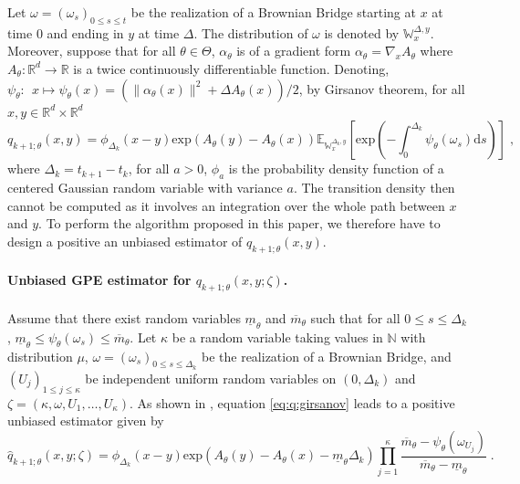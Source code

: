 \documentclass[12pt]{article}
\newcommand{\gpeUB}{\overline{m}_{\parvec}}
\newcommand{\gpeLB}{\underline{m}_{\parvec}}
\def\Xset{\mathbb{R}^d}
\newcommand{\parvec}{\theta}
\newcommand{\parspace}{\Theta}
\newcommand{\hd}[1]{q_{#1}}
\newcommand{\hdhat}[1]{\widehat{q}_{#1}}
\newcommand{\rset}{\ensuremath{\mathbb{R}}}
\newcommand{\rmd}{\ensuremath{\mathrm{d}}}
\newcommand{\eqsp}{\;}
\begin{document}
Let $\omega = (\omega_s)_{0 \leq s \leq t}$ be the realization of a Brownian Bridge starting at $x$ at time 0 and ending in $y$ at time $\Delta$. The distribution of $\omega$ is denoted by  $\mathbb{W}_x^{\Delta,y}$. 
Moreover, suppose that for all $\parvec\in\parspace$, $\alpha_{\parvec}$ is of a gradient form $\alpha_{\parvec} = \nabla_x A_{\parvec}$ where $A_{\parvec}:\Xset \to \rset$ is a twice continuously differentiable function. Denoting, $ \psi_\theta:~~x \mapsto  \psi_\theta(x) = (\|\alpha_{\parvec}(x)\|^2 + \Delta A_{\parvec}(x))/2$, by Girsanov theorem, for all $x, y \in \mathbb{R}^d \times \mathbb{R}^d$
\begin{equation}
\label{eq:q:girsanov}
\hd{k+1;\parvec}(x,y) = \phi_{\Delta_k}(x-y)\mathrm{exp}\left(A_{\parvec}(y) - A_{\parvec}(x)\right)\mathbb{E}_{\mathbb{W}_x^{\Delta_k,y}}\left[\mathrm{exp}\left(-\int_0^{\Delta_k} \psi_{\parvec}(\omega_s)\rmd s\right)\right]\eqsp,
\end{equation}
where $\Delta_k = t_{k+1}-t_k$, for all $a>0$, $\phi_a$ is the probability density function of a centered Gaussian random variable with variance $a$. The transition density then cannot be computed as it involves an integration over the whole path between $x$ and $y$. 
To perform the algorithm proposed in this paper, we therefore have to design a positive an unbiased estimator of $\hd{k+1;\parvec}(x,y)$. 

\paragraph{Unbiased GPE estimator for $\hd{k+1;\parvec}(x,y;\zeta)$.}

Assume that there exist random variables $\gpeLB$ and $\gpeUB$ such that for all $0\leqslant s \leqslant \Delta_k$, $\gpeLB \leqslant \psi_{\parvec}(\omega_s) \leqslant \gpeUB$. Let $\kappa$ be a random variable taking values in $\mathbb{N}$ with distribution $\mu$, $\omega = (\omega_s)_{0 \leq s \leq \Delta_k}$ be the realization of a Brownian Bridge, and $(U_j)_{1\leqslant j \leqslant \kappa}$ be independent uniform random
variables on $(0,\Delta_k)$ and $\zeta = (\kappa,\omega, U_1, \ldots , U_{\kappa})$. As
shown in \cite{fearnhead2008particle}, equation \eqref{eq:q:girsanov} leads to a positive unbiased estimator given by
\[
\hdhat{k+1;\parvec}(x,y;\zeta) = \phi_{\Delta_k}(x-y)\mathrm{exp}\left(A_{\parvec}(y) - A_{\parvec}(x) - \gpeLB\Delta_k\right)\prod_{j=1}^{\kappa}\frac{\gpeUB-\psi_{\parvec}(\omega_{{U_j}})}{\gpeUB-\gpeLB}\eqsp.
\]
\end{document}

